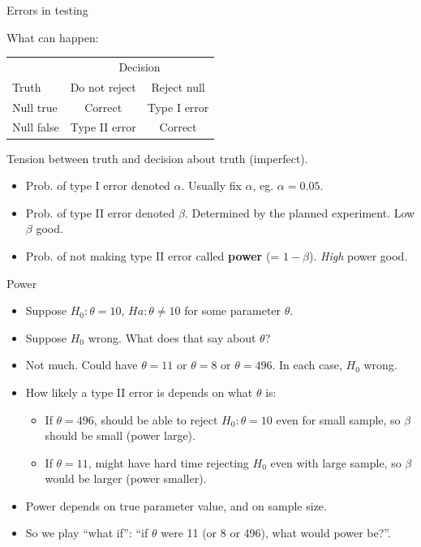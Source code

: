 \documentclass[ignorenonframetext,]{beamer}
\providecommand{\tightlist}{%
  \setlength{\itemsep}{0pt}\setlength{\parskip}{0pt}}
\begin{document}
\begin{frame}{Errors in testing}
\protect\hypertarget{errors-in-testing}{}

What can happen:

\begin{center}
\begin{tabular}{|l|cc|}
\hline
  & \multicolumn{2}{c|}{Decision}\\
Truth & Do not reject & Reject null\\
\hline
Null true & Correct & Type I error\\
Null false & Type II error & Correct\\
\hline
\end{tabular}  
\end{center}

Tension between truth and decision about truth (imperfect).

\begin{itemize}
\tightlist
\item
  Prob. of type I error denoted \(\alpha\). Usually fix \(\alpha\), eg.
  \(\alpha = 0.05\).
\item
  Prob. of type II error denoted \(\beta\). Determined by the planned
  experiment. Low \(\beta\) good.
\item
  Prob. of not making type II error called \textbf{power} (=
  \(1 - \beta\)). \emph{High} power good.
\end{itemize}

\end{frame}

\begin{frame}{Power}
\protect\hypertarget{power}{}

\begin{itemize}
\tightlist
\item
  Suppose \(H_0 : \theta = 10\), \(H a : \theta \ne 10\) for some
  parameter \(\theta\).
\item
  Suppose \(H_0\) wrong. What does that say about \(\theta\)?
\item
  Not much. Could have \(\theta = 11\) or \(\theta = 8\) or
  \(\theta = 496\). In each case, \(H_0\) wrong.
\item
  How likely a type II error is depends on what \(\theta\) is:

  \begin{itemize}
  \tightlist
  \item
    If \(\theta = 496\), should be able to reject \(H_0 : \theta = 10\)
    even for small sample, so \(\beta\) should be small (power large).
  \item
    If \(\theta = 11\), might have hard time rejecting \(H_0\) even with
    large sample, so \(\beta\) would be larger (power smaller).
  \end{itemize}
\item
  Power depends on true parameter value, and on sample size.
\item
  So we play ``what if'': ``if \(\theta\) were 11 (or 8 or 496), what
  would power be?''.
\end{itemize}

\end{frame}
\end{document}
